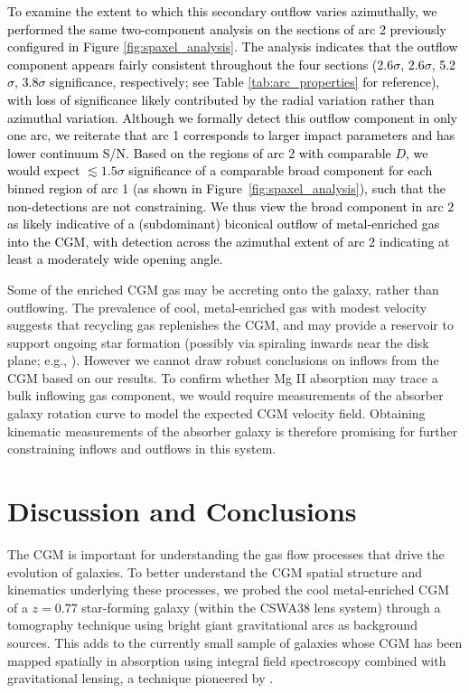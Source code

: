 \documentclass[twocolumn]{aastex62}
\newcommand{\MgII}{Mg\tiny{ }\footnotesize{II}\normalsize{ }}
\begin{document}
\textcolor{black}{To examine the extent to which this secondary outflow varies azimuthally, we performed the same two-component analysis on the sections of arc 2 previously configured in Figure \ref{fig:spaxel_analysis}. The analysis indicates that the outflow component appears fairly consistent throughout the four sections (2.6$\sigma$, 2.6$\sigma$, 5.2$\sigma$, 3.8$\sigma$ significance, respectively; see Table \ref{tab:arc_properties} for reference), with loss of significance likely contributed by the radial variation rather than azimuthal variation. 
Although we formally detect this outflow component in only one arc, we reiterate that arc 1 corresponds to larger impact parameters and has lower continuum S/N. Based on the regions of arc 2 with comparable $D$, we would expect $\lesssim 1.5\sigma$ significance of a comparable broad component for each binned region of arc 1 (as shown in Figure~\ref{fig:spaxel_analysis}), such that the non-detections are not constraining. We thus view the broad component in arc 2 as likely indicative of a (subdominant) biconical outflow of metal-enriched gas into the CGM, with detection across the azimuthal extent of arc 2 indicating at least a moderately wide opening angle.}

Some of the enriched CGM gas may be accreting onto the galaxy, rather than outflowing. The prevalence of cool, metal-enriched gas with modest velocity suggests that recycling gas replenishes the CGM, and may provide a reservoir to support ongoing star formation (possibly via spiraling inwards near the disk plane; e.g., \citealt{Ho2017, Martin2019}). 
However we cannot draw robust conclusions on inflows from the CGM based on our results. To confirm whether \MgII absorption may trace a bulk inflowing gas component, we would require measurements of the absorber galaxy rotation curve to model the expected CGM velocity field. Obtaining kinematic measurements of the absorber galaxy is therefore promising for further constraining inflows and outflows in this system.

\section{Discussion and Conclusions} \label{sec:discussion}

The CGM is important for understanding the gas flow processes that drive the evolution of galaxies. To better understand the CGM spatial structure and kinematics underlying these processes, we probed the cool metal-enriched CGM of a $z = 0.77$ star-forming galaxy (within the CSWA38 lens system) through a tomography technique using bright giant gravitational arcs as background sources. 
This adds to the currently small sample of galaxies whose CGM has been mapped spatially in absorption using integral field spectroscopy combined with gravitational lensing, a technique pioneered by \cite{Lopez2018}. 
\end{document}
